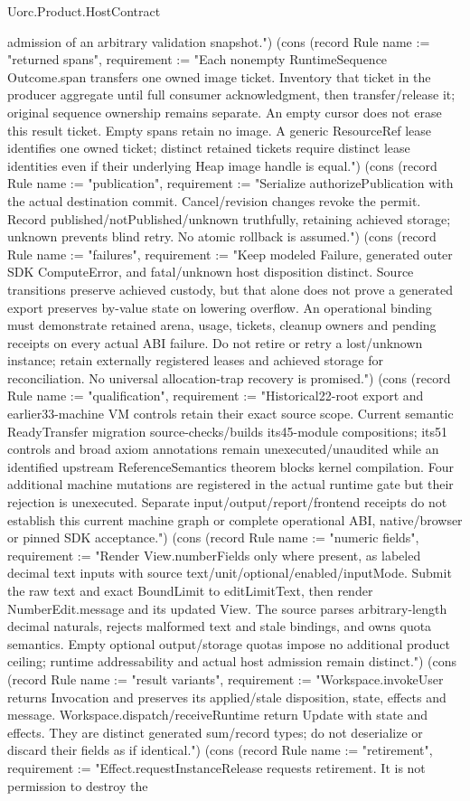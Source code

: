 \begin{lexlean}{Uorc.Product.HostContract}
\begin{semanticmodule}
{admission of an arbitrary validation snapshot."}) (cons (record Rule {name := "returned spans", requirement := "Each nonempty RuntimeSequence Outcome.span transfers one owned image ticket. Inventory that ticket in the producer aggregate until full consumer acknowledgment, then transfer/release it; original sequence ownership remains separate. An empty cursor does not erase this result ticket. Empty spans retain no image. A generic ResourceRef lease identifies one owned ticket; distinct retained tickets require distinct lease identities even if their underlying Heap image handle is equal."}) (cons (record Rule {name := "publication", requirement := "Serialize authorizePublication with the actual destination commit. Cancel/revision changes revoke the permit. Record published/notPublished/unknown truthfully, retaining achieved storage; unknown prevents blind retry. No atomic rollback is assumed."}) (cons (record Rule {name := "failures", requirement := "Keep modeled Failure, generated outer SDK ComputeError, and fatal/unknown host disposition distinct. Source transitions preserve achieved custody, but that alone does not prove a generated export preserves by-value state on lowering overflow. An operational binding must demonstrate retained arena, usage, tickets, cleanup owners and pending receipts on every actual ABI failure. Do not retire or retry a lost/unknown instance; retain externally registered leases and achieved storage for reconciliation. No universal allocation-trap recovery is promised."}) (cons (record Rule {name := "qualification", requirement := "Historical22-root export and earlier33-machine VM controls retain their exact source scope. Current semantic ReadyTransfer migration source-checks/builds its45-module compositions; its51 controls and broad axiom annotations remain unexecuted/unaudited while an identified upstream ReferenceSemantics theorem blocks kernel compilation. Four additional machine mutations are registered in the actual runtime gate but their rejection is unexecuted. Separate input/output/report/frontend receipts do not establish this current machine graph or complete operational ABI, native/browser or pinned SDK acceptance."}) (cons (record Rule {name := "numeric fields", requirement := "Render View.numberFields only where present, as labeled decimal text inputs with source text/unit/optional/enabled/inputMode. Submit the raw text and exact BoundLimit to editLimitText, then render NumberEdit.message and its updated View. The source parses arbitrary-length decimal naturals, rejects malformed text and stale bindings, and owns quota semantics. Empty optional output/storage quotas impose no additional product ceiling; runtime addressability and actual host admission remain distinct."}) (cons (record Rule {name := "result variants", requirement := "Workspace.invokeUser returns Invocation and preserves its applied/stale disposition, state, effects and message. Workspace.dispatch/receiveRuntime return Update with state and effects. They are distinct generated sum/record types; do not deserialize or discard their fields as if identical."}) (cons (record Rule {name := "retirement", requirement := "Effect.requestInstanceRelease requests retirement. It is not permission to destroy the }
\end{semanticmodule}
\end{lexlean}
